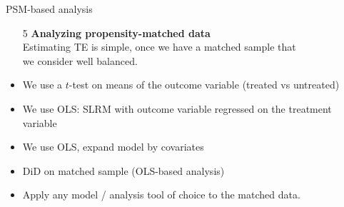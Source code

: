 \documentclass{beamer}
\begin{document}
\begin{frame}{PSM-based analysis}
\begin{enumerate}
    \item[5] \textbf{Analyzing propensity-matched data} \\ \medskip
    Estimating TE is simple, once we have a matched sample that \\we consider well balanced. 
\end{enumerate}
\medskip
\begin{itemize}
    \item We use a $t$-test on means of the outcome variable (treated vs untreated)
    \smallskip
    \item We use OLS: SLRM with outcome variable regressed on the treatment variable
    \smallskip
    \item We use OLS, expand model by covariates
    \smallskip
    \item DiD on matched sample (OLS-based analysis)
    \smallskip
    \item Apply any model / analysis tool of choice to the matched data.
\end{itemize}    
\end{frame}
% 
\end{document}
